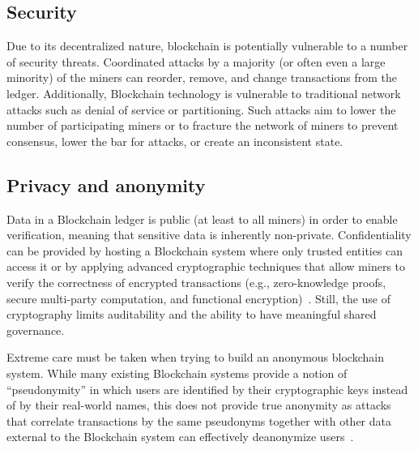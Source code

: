 \subsection{Security}
Due to its decentralized nature, blockchain is potentially vulnerable to a number of security threats.
Coordinated attacks by a majority (or often even a large minority) of the miners can reorder, remove, and change transactions from the ledger. 
Additionally, Blockchain technology is vulnerable to traditional network attacks such as denial of service or partitioning.
Such attacks aim to lower the number of participating miners or to fracture the network of miners to prevent consensus, lower the bar for attacks, or create an inconsistent state.

\subsection{Privacy and anonymity}
Data in a Blockchain ledger is public (at least to all miners) in order to enable verification, meaning that sensitive data is inherently non-private.
Confidentiality can be provided by hosting a Blockchain system where only trusted entities can access it or by applying advanced cryptographic techniques that allow miners to verify the correctness of encrypted transactions (e.g., zero-knowledge proofs, secure multi-party computation, and functional encryption)~\cite{SP:KMSWP16}.
Still, the use of cryptography limits auditability and the ability to have 
meaningful shared governance.

Extreme care must be taken when trying to build an anonymous blockchain system.
While many existing Blockchain systems provide a notion of ``pseudonymity'' in which users are identified by their cryptographic keys instead of by their real-world names, this does not provide true anonymity as attacks that correlate transactions by the same pseudonyms together with other data external to the Blockchain system can effectively deanonymize users~\cite{DBLP:journals/corr/abs-1708-04748}.

